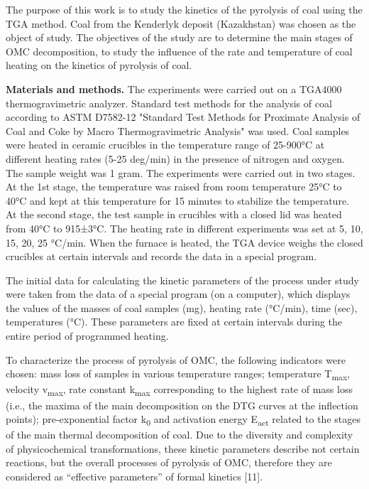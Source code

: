 The purpose of this work is to study the kinetics of the pyrolysis of
coal using the TGA method. Coal from the Kenderlyk deposit (Kazakhstan)
was chosen as the object of study. The objectives of the study are to
determine the main stages of OMC decomposition, to study the influence
of the rate and temperature of coal heating on the kinetics of pyrolysis
of coal.

{\bfseries Materials and methods.} The experiments were carried out on a
TGA4000 thermogravimetric analyzer. Standard test methods for the
analysis of coal according to ASTM D7582-12 "Standard Test Methods for
Proximate Analysis of Coal and Coke by Macro Thermogravimetric Analysis"
was used. Coal samples were heated in ceramic crucibles in the
temperature range of 25-900°C at different heating rates (5-25 deg/min)
in the presence of nitrogen and oxygen. The sample weight was 1 gram.
The experiments were carried out in two stages. At the 1st stage, the
temperature was raised from room temperature 25°C to 40°C and kept at
this temperature for 15 minutes to stabilize the temperature. At the
second stage, the test sample in crucibles with a closed lid was heated
from 40°C to 915±3°C. The heating rate in different experiments was set
at 5, 10, 15, 20, 25 °C/min. When the furnace is heated, the TGA device
weighs the closed crucibles at certain intervals and records the data in
a special program.

The initial data for calculating the kinetic parameters of the process
under study were taken from the data of a special program (on a
computer), which displays the values of the masses of coal samples (mg),
heating rate (°C/min), time (sec), temperatures (°C). These parameters
are fixed at certain intervals during the entire period of programmed
heating.

To characterize the process of pyrolysis of OMC, the following
indicators were chosen: mass loss of samples in various temperature
ranges; temperature T\textsubscript{max}, velocity v\textsubscript{max},
rate constant k\textsubscript{max} corresponding to the highest rate of
mass loss (i.e., the maxima of the main decomposition on the DTG curves
at the inflection points); pre-exponential factor k\textsubscript{0} and
activation energy E\textsubscript{act} related to the stages of the main
thermal decomposition of coal. Due to the diversity and complexity of
physicochemical transformations, these kinetic parameters describe not
certain reactions, but the overall processes of pyrolysis of OMC,
therefore they are considered as ``effective parameters'' of formal
kinetics {[}11{]}.

